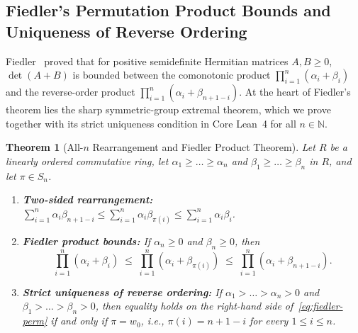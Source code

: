 \documentclass[11pt,a4paper]{article}
\theoremstyle{plain}
\newtheorem{theorem}{Theorem}[section]
\theoremstyle{definition}
\newcommand{\N}{\mathbb{N}}
\begin{document}
\subsection{Fiedler's Permutation Product Bounds and Uniqueness of Reverse Ordering}
Fiedler~\cite{Fiedler1971} proved that for positive semidefinite Hermitian matrices $A, B \ge 0$, $\det(A + B)$ is bounded between the comonotonic product $\prod_{i=1}^n (\alpha_i + \beta_i)$ and the reverse-order product $\prod_{i=1}^n (\alpha_i + \beta_{n+1-i})$. At the heart of Fiedler's theorem lies the sharp symmetric-group extremal theorem, which we prove together with its strict uniqueness condition in Core Lean~4 for all $n \in \N$.

\begin{theorem}[All-$n$ Rearrangement and Fiedler Product Theorem]\label{thm:fiedler-perm}
Let $R$ be a linearly ordered commutative ring, let $\alpha_1 \ge \dots \ge \alpha_n$ and $\beta_1 \ge \dots \ge \beta_n$ in $R$, and let $\pi \in S_n$.
\begin{enumerate}
  \item \textbf{Two-sided rearrangement:} $\sum_{i=1}^n \alpha_i \beta_{n+1-i} \le \sum_{i=1}^n \alpha_i \beta_{\pi(i)} \le \sum_{i=1}^n \alpha_i \beta_i$.
  \item \textbf{Fiedler product bounds:} If $\alpha_n \ge 0$ and $\beta_n \ge 0$, then
  \begin{equation}\label{eq:fiedler-perm}
    \prod_{i=1}^n (\alpha_i + \beta_i)
    \;\le\;
    \prod_{i=1}^n (\alpha_i + \beta_{\pi(i)})
    \;\le\;
    \prod_{i=1}^n (\alpha_i + \beta_{n+1-i}).
  \end{equation}
  \item \textbf{Strict uniqueness of reverse ordering:} If $\alpha_1 > \dots > \alpha_n > 0$ and $\beta_1 > \dots > \beta_n > 0$, then equality holds on the right-hand side of~\eqref{eq:fiedler-perm} \emph{if and only if} $\pi = w_0$, i.e., $\pi(i) = n + 1 - i$ for every $1 \le i \le n$.
\end{enumerate}
\end{theorem}
\end{document}
